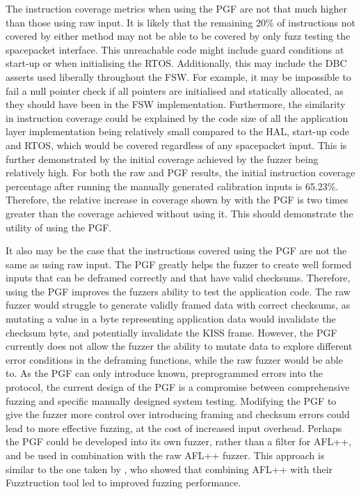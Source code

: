 \documentclass[../report.tex]{subfiles}
\begin{document}
The instruction coverage metrics when using the PGF are not that much higher
than those using raw input. It is likely that the remaining 20\% of instructions
not covered by either method may not be able to be covered by only fuzz testing
the spacepacket interface. This unreachable code might include guard conditions
at start-up or when initialising the RTOS. Additionally, this may include the
DBC asserts used liberally throughout the FSW. For example, it may be
impossible to fail a null pointer check if all pointers are initialised and
statically allocated, as they should have been in the FSW implementation.
Furthermore, the similarity in instruction coverage could be explained by the
code size of all the application layer implementation being relatively small
compared to the HAL, start-up code and RTOS, which would be covered regardless
of any spacepacket input. This is further demonstrated by the initial coverage
achieved by the fuzzer being relatively high. For both the raw and PGF results,
the initial instruction coverage percentage after running the manually
generated calibration inputs is 65.23\%. Therefore, the relative increase in
coverage shown by with the PGF is two times greater than the coverage achieved
without using it. This should demonstrate the utility of using the PGF.

It also may be the case that the instructions covered using the PGF are not the
same as using raw input. The PGF greatly helps the fuzzer to create well formed
inputs that can be deframed correctly and that have valid checksums. Therefore,
using the PGF improves the fuzzers ability to test the application code. The
raw fuzzer would struggle to generate validly framed data with correct
checksums, as mutating a value in a byte representing application data would
invalidate the checksum byte, and potentially invalidate the KISS frame.
However, the PGF currently does not allow the fuzzer the ability to mutate data
to explore different error conditions in the deframing functions, while the raw
fuzzer would be able to. As the PGF can only introduce known, preprogrammed
errors into the protocol, the current design of the PGF is a compromise between
comprehensive fuzzing and specific manually designed system testing. Modifying
the PGF to give the fuzzer more control over introducing framing and checksum
errors could lead to more effective fuzzing, at the cost of increased input
overhead. Perhaps the PGF could be developed into its own fuzzer, rather than a filter
for AFL++, and be used in combination with the raw AFL++ fuzzer. This approach
is similar to the one taken by \citet{Fuzztruction_2023}, who showed that
combining AFL++ with their Fuzztruction tool led to improved fuzzing performance.
\end{document}
